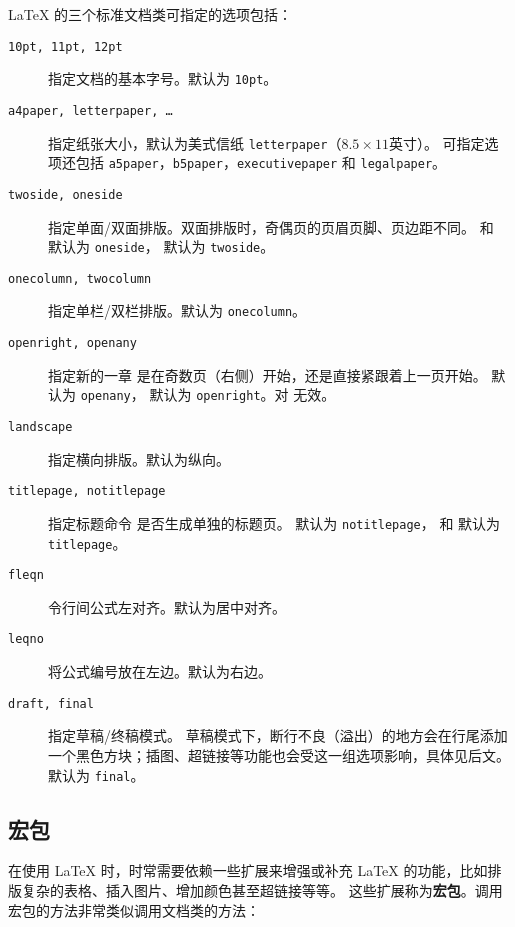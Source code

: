 \LaTeX{} 的三个标准文档类可指定的选项包括：
\begin{description}
\item[\texttt{10pt, 11pt, 12pt}] \quad 指定文档的基本字号。默认为 \texttt{10pt}。
\item[\texttt{a4paper, letterpaper, \ldots}] \quad 指定纸张大小，默认为美式信纸 \texttt{letterpaper}（$8.5\times11$英寸）。
可指定选项还包括 \texttt{a5paper}，\texttt{b5paper}，\texttt{executivepaper} 和 \texttt{legalpaper}。
\item[\texttt{twoside, oneside}] \quad 指定单面/双面排版。双面排版时，奇偶页的页眉页脚、页边距不同。
 和  默认为 \texttt{oneside}， 默认为 \texttt{twoside}。
\item[\texttt{onecolumn, twocolumn}] \quad 指定单栏/双栏排版。默认为 \texttt{onecolumn}。
\item[\texttt{openright, openany}] \quad 指定新的一章  是在奇数页（右侧）开始，还是直接紧跟着上一页开始。
 默认为 \texttt{openany}， 默认为 \texttt{openright}。对  无效。
\item[\texttt{landscape}] \quad 指定横向排版。默认为纵向。
\item[\texttt{titlepage, notitlepage}] 指定标题命令  是否生成单独的标题页。
 默认为 \texttt{notitlepage}， 和  默认为 \texttt{titlepage}。
\item[\texttt{fleqn}] \quad 令行间公式左对齐。默认为居中对齐。
\item[\texttt{leqno}] \quad 将公式编号放在左边。默认为右边。
\item[\texttt{draft, final}] \quad 指定草稿/终稿模式。
草稿模式下，断行不良（溢出）的地方会在行尾添加一个黑色方块；插图、超链接等功能也会受这一组选项影响，具体见后文。默认为 \texttt{final}。
\end{description}

\subsection{宏包}\label{subsec:packages}

在使用 \LaTeX{} 时，时常需要依赖一些扩展来增强或补充 \LaTeX{} 的功能，比如排版复杂的表格、插入图片、增加颜色甚至超链接等等。
这些扩展称为\textbf{宏包}。调用宏包的方法非常类似调用文档类的方法：
\begin{command}
\end{command}

